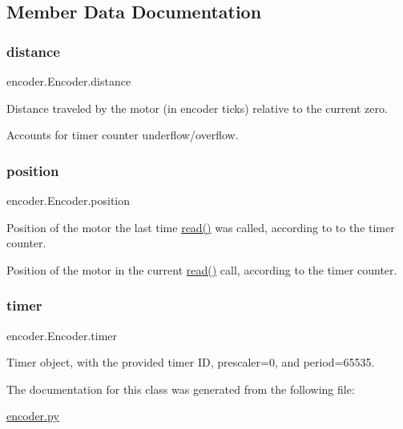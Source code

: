 \subsection{Member Data Documentation}
\mbox{\label{classencoder_1_1_encoder_ac16be7b70ef28d19b75108d422f82e28}} 
\subsubsection{\texorpdfstring{distance}{distance}}
{\footnotesize\ttfamily encoder.\+Encoder.\+distance}



Distance traveled by the motor (in encoder ticks) relative to the current zero. 

Accounts for timer counter underflow/overflow. \mbox{\label{classencoder_1_1_encoder_a9c15eb087b5869c188cf94e53ea3b4f5}} 
\subsubsection{\texorpdfstring{position}{position}}
{\footnotesize\ttfamily encoder.\+Encoder.\+position}



Position of the motor the last time \mbox{\hyperlink{classencoder_1_1_encoder_aa1c1535160682500f5214f45d8197027}{read()}} was called, according to to the timer counter. 

Position of the motor in the current \mbox{\hyperlink{classencoder_1_1_encoder_aa1c1535160682500f5214f45d8197027}{read()}} call, according to the timer counter.\mbox{\label{classencoder_1_1_encoder_a8e9c3e1317abc4f6fbe95468c69223d1}} 
\subsubsection{\texorpdfstring{timer}{timer}}
{\footnotesize\ttfamily encoder.\+Encoder.\+timer}



Timer object, with the provided timer ID, prescaler=0, and period=65535. 



The documentation for this class was generated from the following file\+:\begin{DoxyCompactItemize}
\item 
\mbox{\hyperlink{encoder_8py}{encoder.\+py}}\end{DoxyCompactItemize}
